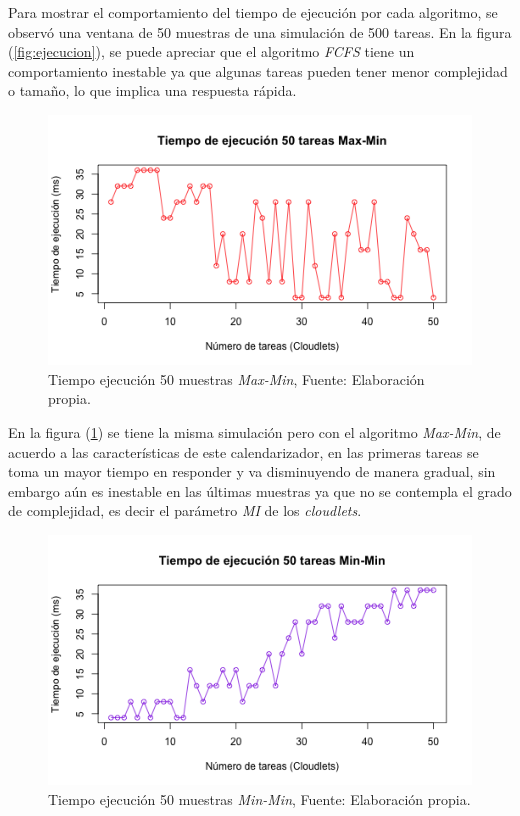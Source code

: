 \documentclass[jou,apacite]{apa6}
\begin{document}
Para mostrar el comportamiento del tiempo de ejecuci\'on por cada algoritmo, se observó una ventana de 50 muestras de una simulaci\'on de 500 tareas. En la figura (\ref{fig:ejecucion}), se puede apreciar que el algoritmo \textit{FCFS} tiene un comportamiento inestable ya que algunas tareas pueden tener menor complejidad o tamaño, lo que implica una respuesta r\'apida.

\renewcommand\thefigure{\arabic{figure}}
\begin{figure}[h!] 
	\centering
	\includegraphics[scale=0.5]{media/maxmin}
	\caption{Tiempo ejecuci\'on 50 muestras \textit{Max-Min}, Fuente: Elaboraci\'on propia.}
	\label{fig:maxmin}
\end{figure}


 En la figura (\ref{fig:maxmin}) se tiene la misma simulaci\'on pero con el algoritmo \textit{Max-Min}, de acuerdo a las caracter\'isticas de este calendarizador, en las primeras tareas se toma un mayor tiempo en responder y va disminuyendo de manera gradual, sin embargo a\'un es inestable en las \'ultimas muestras ya que no se contempla el grado de complejidad, es decir el par\'ametro \textit{MI} de los \textit{cloudlets}.

 \renewcommand\thefigure{\arabic{figure}}
\begin{figure}[h!] 
	\centering
	\includegraphics[scale=0.5]{media/minmin}
	\caption{Tiempo ejecuci\'on 50 muestras \textit{Min-Min}, Fuente: Elaboraci\'on propia.}
	\label{fig:minmin}
\end{figure}
\end{document}
